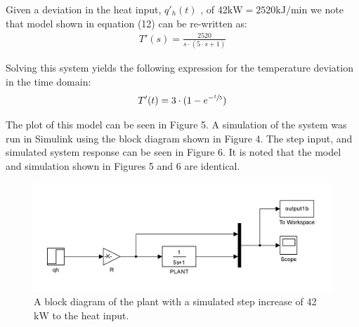 \documentclass{article}
\begin{document}
Given a deviation in the heat input, $q'_h(t)$ , of 42$\si{\kilo\watt} = 2520\si{\kilo\joule\per\minute}$ we note that model shown in equation (12) can be re-written as:
\begin{align}
T'(s) = \frac{2520}{s \cdot (5 \cdot s + 1)}
\end{align}

Solving this system yields the following expression for the temperature deviation in the time domain:
\begin{align}
T'(t) = 3 \cdot (1 - e^{-\sfrac{t}{5}})
\end{align}

The plot of this model can be seen in Figure 5. A simulation of the system was run in Simulink using the block diagram shown in Figure 4. The step input, and simulated system response can be seen in Figure 6. It is noted that the model and simulation shown in Figures 5 and 6 are identical.

\begin{figure}[h]
\centering
\includegraphics[scale=0.15]{block_1b}
\caption{A block diagram of the plant with a simulated step increase of 42$\si{\kilo\watt}$ to the heat input.}
\end{figure}
\end{document}
